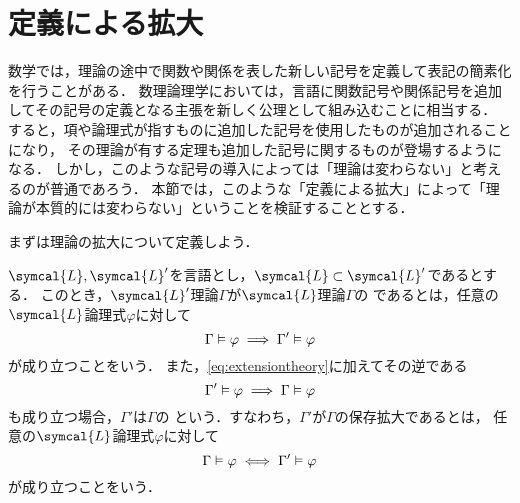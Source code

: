 \section{定義による拡大} \label{sec:extensionbydefinition}

数学では，理論の途中で関数や関係を表した新しい記号を定義して表記の簡素化を行うことがある．
数理論理学においては，言語に関数記号や関係記号を追加してその記号の定義となる主張を新しく公理として組み込むことに相当する．
すると，項や論理式が指すものに追加した記号を使用したものが追加されることになり，
その理論が有する定理も追加した記号に関するものが登場するようになる．
しかし，このような記号の導入によっては「理論は変わらない」と考えるのが普通であろう．
本節では，このような「定義による拡大」によって「理論が本質的には変わらない」ということを検証することとする．

まずは理論の拡大について定義しよう．

\begin{Def} \label{Def:extensiontheory}
	\(\symcal{L}, \symcal{L}'\)を言語とし，\(\symcal{L} \subset \symcal{L}'\)であるとする．
	このとき，\(\symcal{L}'\)理論\(\Gamma\)が\(\symcal{L}\)理論\(\Gamma\)の%
	であるとは，任意の\(\symcal{L}\)論理式\(\varphi\)に対して
	\begin{equation}
		\Gamma \vDash \varphi \implies \Gamma' \vDash \varphi
		\label{eq:extensiontheory}
	\end{equation}
	が成り立つことをいう．
	また，\cref{eq:extensiontheory}に加えてその逆である
	\begin{equation}
		\Gamma' \vDash \varphi \implies \Gamma \vDash \varphi
		\label{eq:conservationextensiontheoryoneside}
	\end{equation}
	も成り立つ場合，\(\Gamma'\)は\(\Gamma\)の%
	という．すなわち，\(\Gamma'\)が\(\Gamma\)の保存拡大であるとは，
	任意の\(\symcal{L}\)論理式\(\varphi\)に対して
	\begin{equation}
		\Gamma \vDash \varphi \iff \Gamma' \vDash \varphi
		\label{eq:conservationextensiontheory}
	\end{equation}
	が成り立つことをいう．
\end{Def}

